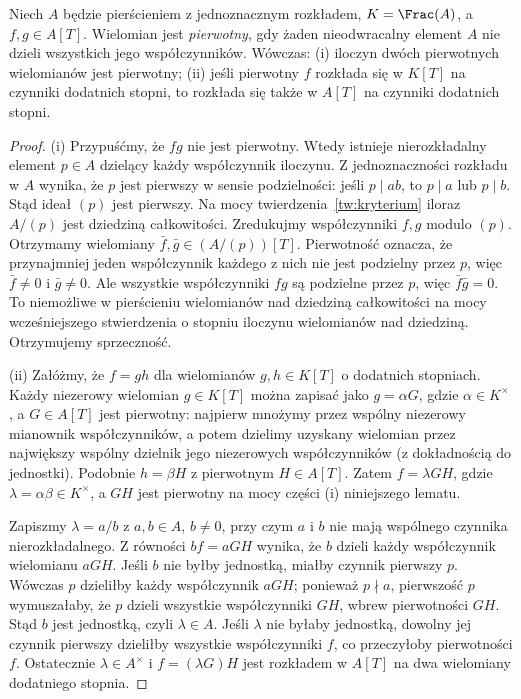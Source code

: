 \begin{lemat}
\label{lem:gauss-ufd}
Niech $A$ będzie pierścieniem z jednoznacznym rozkładem,
$K=\Frac(A)$, a $f,g\in A[T]$. Wielomian jest
\emph{pierwotny}, gdy żaden nieodwracalny element $A$
nie dzieli wszystkich jego współczynników.
Wówczas: (i) iloczyn dwóch pierwotnych wielomianów jest
pierwotny; (ii) jeśli pierwotny $f$ rozkłada się
w $K[T]$ na czynniki dodatnich stopni, to rozkłada się
także w $A[T]$ na czynniki dodatnich stopni.
\end{lemat}
\begin{proof}
(i) Przypuśćmy, że $fg$ nie jest pierwotny. Wtedy
istnieje nierozkładalny element $p\in A$ dzielący każdy
współczynnik iloczynu. Z jednoznaczności rozkładu w $A$
wynika, że $p$ jest pierwszy w sensie podzielności:
jeśli $p\mid ab$, to $p\mid a$ lub $p\mid b$.
Stąd ideał $(p)$ jest pierwszy.
Na mocy twierdzenia~\ref{tw:kryterium}
iloraz $A/(p)$ jest dziedziną całkowitości.
Zredukujmy współczynniki $f,g$ modulo $(p)$.
Otrzymamy wielomiany $\bar f,\bar g\in(A/(p))[T]$.
Pierwotność oznacza, że przynajmniej jeden współczynnik
każdego z nich nie jest podzielny przez $p$,
więc $\bar f\ne0$ i $\bar g\ne0$.
Ale wszystkie współczynniki $fg$ są podzielne przez $p$,
więc $\bar f\bar g=0$. To niemożliwe w pierścieniu
wielomianów nad dziedziną całkowitości na mocy
wcześniejszego stwierdzenia o stopniu iloczynu wielomianów
nad dziedziną. Otrzymujemy sprzeczność.

(ii) Załóżmy, że $f=gh$ dla wielomianów
$g,h\in K[T]$ o dodatnich stopniach.
Każdy niezerowy wielomian $g\in K[T]$ można zapisać
jako $g=\alpha G$, gdzie $\alpha\in K^\times$,
a $G\in A[T]$ jest pierwotny: najpierw mnożymy przez
wspólny niezerowy mianownik współczynników, a potem
dzielimy uzyskany wielomian przez największy wspólny dzielnik
jego niezerowych współczynników (z dokładnością do jednostki).
Podobnie $h=\beta H$ z pierwotnym $H\in A[T]$.
Zatem $f=\lambda GH$, gdzie $\lambda=\alpha\beta\in K^\times$,
a $GH$ jest pierwotny na mocy części (i) niniejszego lematu.

Zapiszmy $\lambda=a/b$ z $a,b\in A$, $b\ne0$,
przy czym $a$ i $b$ nie mają wspólnego czynnika nierozkładalnego.
Z równości $bf=aGH$ wynika, że $b$ dzieli każdy
współczynnik wielomianu $aGH$. Jeśli $b$ nie byłby
jednostką, miałby czynnik pierwszy $p$. Wówczas $p$
dzieliłby każdy współczynnik $aGH$; ponieważ $p\nmid a$,
pierwszość $p$ wymuszałaby, że $p$ dzieli wszystkie
współczynniki $GH$, wbrew pierwotności $GH$.
Stąd $b$ jest jednostką, czyli $\lambda\in A$.
Jeśli $\lambda$ nie byłaby jednostką, dowolny jej
czynnik pierwszy dzieliłby wszystkie współczynniki $f$,
co przeczyłoby pierwotności $f$. Ostatecznie
$\lambda\in A^\times$ i $f=(\lambda G)H$ jest rozkładem
w $A[T]$ na dwa wielomiany dodatniego stopnia.
\end{proof}

